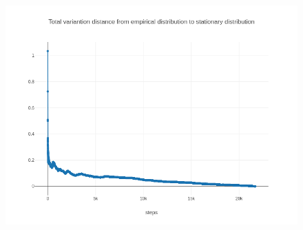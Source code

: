 \documentclass[10pt]{article}
\begin{document}
\begin{figure}[ht]
  \centering
  \includegraphics[scale=.65]{../pictures/mixing-time-analysis.png}
\end{figure}
\end{document}
